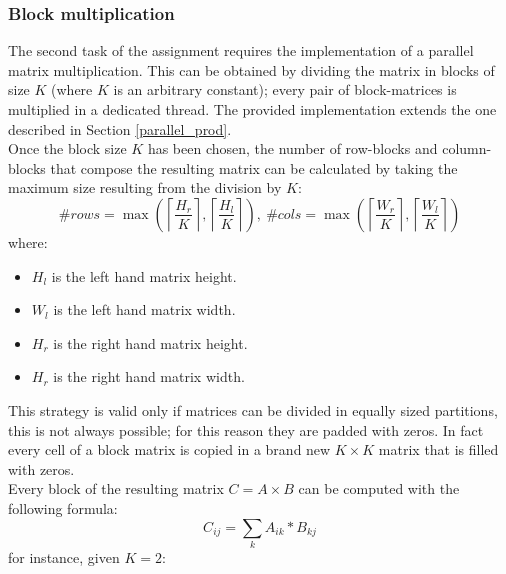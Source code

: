 \documentclass[11pt,a4paper]{article}
\begin{document}


\subsubsection{Block multiplication}\label{block_structure}
The second task of the assignment requires the implementation of a parallel
matrix multiplication. This can be obtained by dividing the matrix in blocks
of size $K$ (where $K$ is an arbitrary constant); every pair of block-matrices is
multiplied in a dedicated thread. The provided implementation extends the one
described in Section \ref{parallel_prod}.\\ Once the block size $K$ has been
chosen, the number of row-blocks and column-blocks that compose the resulting
matrix can be calculated by taking the maximum size resulting from the division
by $K$:
\[
    \#\textit{rows}=\max\left(\left\lceil \frac{H_r}{K}\right\rceil, \left\lceil \frac{H_l}{K}\right\rceil \right),~\#\textit{cols}=\max\left(\left\lceil \frac{W_r}{K}\right\rceil, \left\lceil \frac{W_l}{K}\right\rceil \right)
\]
where: 
\begin{itemize}
    \item $H_l$ is the left hand matrix height.
    \item $W_l$ is the left hand matrix width.
    \item $H_r$ is the right hand matrix height.
    \item $H_r$ is the right hand matrix width.
\end{itemize}
This strategy is valid only if matrices can be divided in equally sized partitions,
this is not always possible; for this reason they are padded with zeros.  In fact
every cell of a block matrix is copied in a brand new $K\times K$ matrix that is
filled with zeros.\\ Every block of the resulting matrix $C=A\times B$ can be
computed with the following formula:
\[
    C_{ij}=\sum_k A_{ik}*B_{kj}
\]
for instance, given $K=2$:

\end{document}

